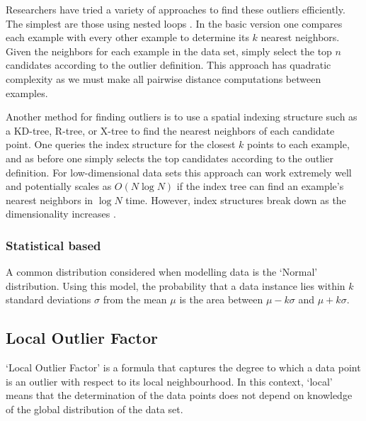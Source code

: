 Researchers have tried a variety of approaches to find these outliers
efficiently. The simplest are those using nested loops \cite{Bay:2003}. In the
basic version one compares each example with every other example to determine
its $k$ nearest neighbors. Given the neighbors for each example in the data set,
simply select the top $n$ candidates according to the outlier definition. This
approach has quadratic complexity as we must make all pairwise distance
computations between examples.

Another method for finding outliers is to use a spatial indexing structure such
as a KD-tree, R-tree, or X-tree to find the nearest neighbors of each candidate
point. One queries the index structure for the closest $k$ points to each
example, and as before one simply selects the top candidates according to the
outlier definition. For low-dimensional data sets this approach can work
extremely well and potentially scales as $O(N \log N)$ if the index tree can
find an example's nearest neighbors in $\log N$ time. However, index structures
break down as the dimensionality increases \cite{Bay:2003}.

\subsubsection{Statistical based}
\label{anomalyDetection:approaches:statistical}
A common distribution considered when modelling data is the `Normal' 
distribution. Using this model, the probability that a data instance lies within
$k$ standard deviations $\sigma$ from the mean $\mu$ is the area between
$\mu - k\sigma$ and $\mu + k\sigma$.

\subsection{Local Outlier Factor}
\label{anomalyDetection:localOutlierFactor}
`Local Outlier Factor' is a formula that captures the degree to which a data
point is an outlier with respect to its local neighbourhood. In this context,
`local' means that the determination of the data points does not depend on
knowledge of the global distribution of the data set.
